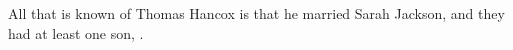
All that is known of Thomas Hancox is that he married Sarah Jackson, and they had at least one son, .
